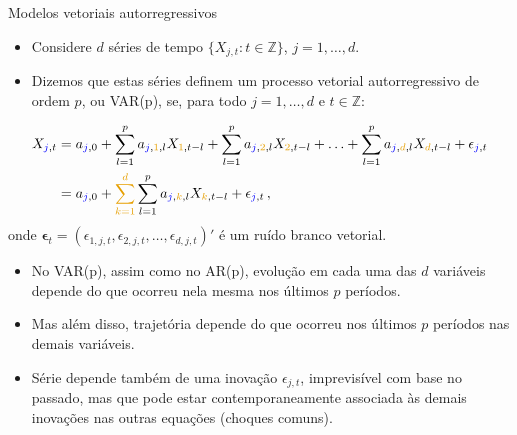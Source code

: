 \documentclass[11pt]{beamer}
\begin{document}
\begin{frame}{Modelos vetoriais autorregressivos}
	\begin{itemize}
		\item Considere $d$ séries de tempo $\{X_{j,t}: t \in \mathbb{Z}\}$, $j=1,\ldots, d$.
		\item Dizemos que estas séries definem um processo vetorial autorregressivo de ordem $p$, ou VAR(p), se, para todo $j=1,\ldots, d$ e $t\in \mathbb{Z}$:
	\end{itemize}
	\begin{equation*}
		\begin{aligned}
			X_{{\color{blue}j},t} &= a_{{\color{blue}j},0}  +\sum_{l=1}^p a_{{\color{blue}j},{\color{orange}1},l} X_{{\color{orange}1},t-l} + \sum_{l=1}^p a_{{\color{blue}j},{\color{orange}2},l} X_{{\color{orange}2},t-l}   +\ldots + \sum_{l=1}^p a_{{\color{blue}j},{\color{orange}d},l} X_{{\color{orange}d},t-l}  + \epsilon_{{\color{blue}j},t} \\
			&= a_{{\color{blue}j},0}  +{\color{orange}\sum_{k=1}^{d}}\sum_{l=1}^p a_{{\color{blue}j},{\color{orange}k},l} X_{{\color{orange}k},t-l} + \epsilon_{{\color{blue}j},t} \, ,
		\end{aligned}
	\end{equation*}
	onde $\boldsymbol{\epsilon}_t = (\epsilon_{1,j,t},\epsilon_{2,j,t},\ldots, \epsilon_{d,j,t})'$ é um ruído branco vetorial.
	\begin{itemize}
		\item No VAR(p), assim como no AR(p), evolução em cada uma das $d$ variáveis depende do que ocorreu nela mesma nos últimos $p$ períodos.
		\item Mas além disso, trajetória depende do que ocorreu nos últimos $p$ períodos {\color{orange}nas demais variáveis}.
		\item Série depende também de uma inovação $\epsilon_{j,t}$, imprevisível com base no passado, mas que pode estar contemporaneamente associada às demais inovações nas outras equações (choques comuns).
	\end{itemize}
\end{frame}
\end{document}

